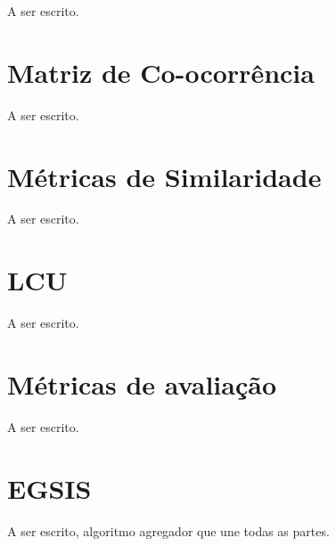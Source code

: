 A ser escrito.

\section{Matriz de Co-ocorrência}\label{sec:teorica-matriz-co-ocorrencia}

A ser escrito.


\section{Métricas de Similaridade}\label{sec:teorica-metricas-de-similaridade}

A ser escrito.


\section{LCU}\label{sec:teorica-lcu}

A ser escrito.

\section{Métricas de avaliação}

A ser escrito.

\section{EGSIS}\label{sec:teorica-egsis}

A ser escrito, algoritmo agregador que une todas as partes.
